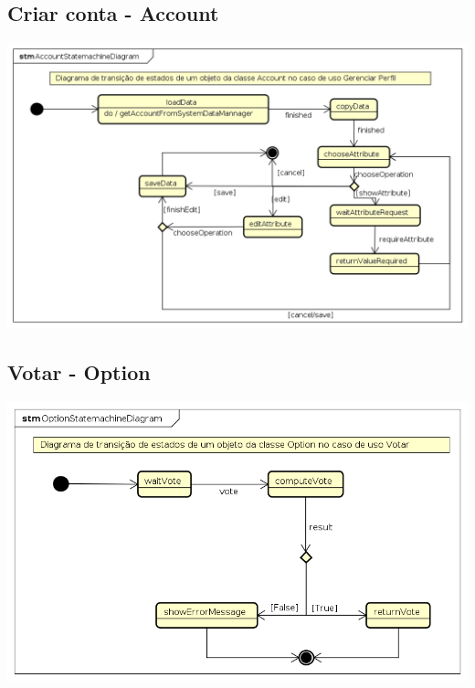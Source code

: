 \documentclass[a4paper,12pt]{report}
\begin{document}
\subsection*{Criar conta - Account}
\markright{}
\includegraphics[width=14.3cm]{statemachine_diagrams/AccountStatemachineDiagram.png}

\subsection*{Votar - Option}
\markright{}
\includegraphics[width=14.3cm]{statemachine_diagrams/OptionStatemachineDiagram.png}
\end{document}
